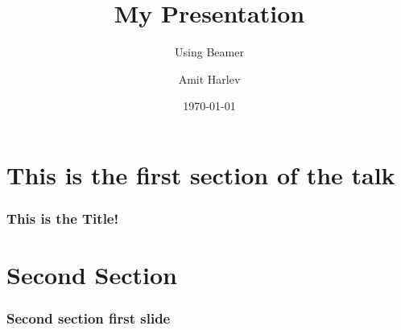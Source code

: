 \documentclass{beamer}
\title{My Presentation}
\subtitle{Using Beamer}
\author{Amit Harlev}
\institute{Harvey Mudd College}
\date{\today}
\begin{document}
    \begin{frame}
        \titlepage
    \end{frame}

    \section{This is the first section of the talk}
    \begin{frame}
        \frametitle{This is the Title!}
    \end{frame}

    \section{Second Section}
    \begin{frame}
        \frametitle{Second section first slide}
    \end{frame}
\end{document}
